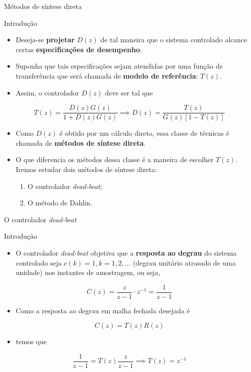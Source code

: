 \begin{frame}{Métodos de síntese direta}
\begin{block}{Introdução}
\begin{itemize}
    \item Deseja-se \textbf{projetar} $D(z)$ de tal maneira  que o sistema controlado alcance certas \textbf{especificações de desempenho}. 
    \item Suponha que  tais especificações sejam atendidas por uma  função de transferência que será chamada de  \textbf{modelo de referência}: $T(z)$. 
    \item Assim, o controlador $D(z)$ deve ser tal que 
\end{itemize}
$$T(z) = \dfrac{D(z)G(z)}{1+D(z)G(z)} \implies \boxed{D(z) = \dfrac{T(z)}{G(z)[1-T(z)]}}$$
\begin{itemize}
    \item Como $D(z)$ é obtido por um cálculo direto, essa classe de técnicas é chamada de \textbf{métodos de síntese direta}. 
    \item O que diferencia os métodos dessa classe é a maneira de escolher $T(z)$. Iremos estudar dois métodos de síntese direta:
    \begin{enumerate}
        \item O controlador \textit{dead-beat};
        \item O método de Dahlin.
    \end{enumerate}
\end{itemize}
\end{block}
\end{frame}

\begin{frame}{O controlador \textit{dead-beat}}
\begin{block}{Introdução}
\begin{itemize}
    \item O controlador \textit{dead-beat} objetiva que a \textbf{resposta ao degrau} do sistema controlado seja $c(k) = 1, k = 1, 2,...$ (degrau unitário atrasado de uma unidade) nos instantes de amostragem, ou seja,
\end{itemize}
$$C(z) = \dfrac{z}{z-1} \cdot z^{-1} = \dfrac{1}{z-1}$$
\begin{itemize}
    \item Como a resposta ao degrau em malha fechada desejada é
\end{itemize}
$$C(z) = T(z) R(z)$$
\vspace{-0.3cm}
\begin{itemize}
    \item[] temos que
\end{itemize}
$$\dfrac{1}{z-1} = T(z) \dfrac{z}{z-1} \implies T(z) = z^{-1}$$
\end{block}
\end{frame}

